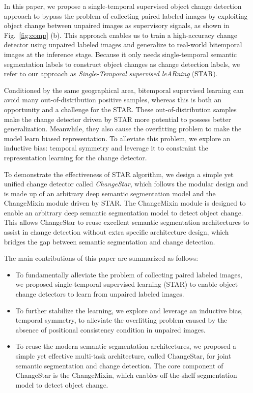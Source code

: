 \documentclass[10pt,twocolumn,letterpaper]{article}
\begin{document}
In this paper, we propose a single-temporal supervised object change detection approach to bypass the problem of collecting paired labeled images by exploiting object change between unpaired images as supervisory signals, as shown in Fig.~\ref{fig:comp} (b).
This approach enables us to train a high-accuracy change detector using unpaired labeled images and generalize to real-world bitemporal images at the inference stage.
Because it only needs single-temporal semantic segmentation labels to construct object changes as change detection labels, we refer to our approach as \textit{Single-Temporal supervised leARning} (STAR).

Conditioned by the same geographical area, bitemporal supervised learning can avoid many out-of-distribution positive samples, whereas this is both an opportunity and a challenge for the STAR.
These out-of-distribution samples make the change detector driven by STAR more potential to possess better generalization.
Meanwhile, they also cause the overfitting problem to make the model learn biased representation.
To alleviate this problem, we explore an inductive bias: temporal symmetry and leverage it to constraint the representation learning for the change detector.

To demonstrate the effectiveness of STAR algorithm, we design a simple yet unified change detector called \textit{ChangeStar}, which follows the modular design and is made up of an arbitrary deep semantic segmentation model and the ChangeMixin module driven by STAR.
The ChangeMixin module is designed to enable an arbitrary deep semantic segmentation model to detect object change.
This allows ChangeStar to reuse excellent semantic segmentation architectures to assist in change detection without extra specific architecture design, which bridges the gap between semantic segmentation and change detection.

The main contributions of this paper are summarized as follows:
\begin{itemize}
    \vspace{-0.1in}
    \item To fundamentally alleviate the problem of collecting paired labeled images, we proposed single-temporal supervised learning (STAR) to enable object change detectors to learn from unpaired labeled images.
    \vspace{-0.1in}
    \item To further stabilize the learning, we explore and leverage an inductive bias, temporal symmetry, to alleviate the overfitting problem caused by the absence of positional consistency condition in unpaired images.
    \vspace{-0.1in}
    \item To reuse the modern semantic segmentation architectures, we proposed a simple yet effective multi-task architecture, called ChangeStar, for joint semantic segmentation and change detection.
    The core component of ChangeStar is the ChangeMixin, which enables off-the-shelf segmentation model to detect object change.
\end{itemize}
\end{document}

